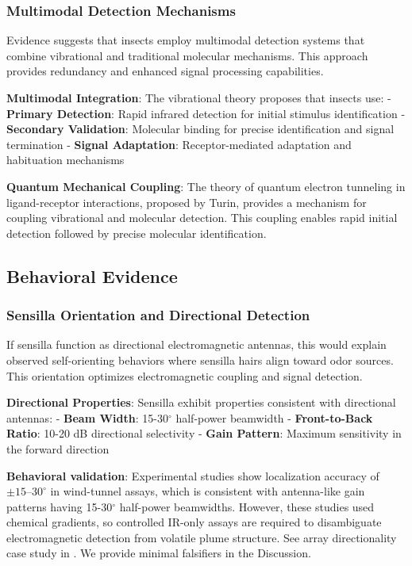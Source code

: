 \documentclass[
  13pt,
  a4paperpaper,
  12pt]{article}
\begin{document}
\subsubsection{Multimodal Detection
Mechanisms}\label{multimodal-detection-mechanisms}

Evidence suggests that insects employ multimodal detection systems that
combine vibrational and traditional molecular mechanisms. This approach
provides redundancy and enhanced signal processing capabilities.

\textbf{Multimodal Integration}: The vibrational theory proposes that
insects use: - \textbf{Primary Detection}: Rapid infrared detection for
initial stimulus identification - \textbf{Secondary Validation}:
Molecular binding for precise identification and signal termination -
\textbf{Signal Adaptation}: Receptor-mediated adaptation and habituation
mechanisms

\textbf{Quantum Mechanical Coupling}: The theory of quantum electron
tunneling in ligand-receptor interactions, proposed by Turin, provides a
mechanism for coupling vibrational and molecular detection. This
coupling enables rapid initial detection followed by precise molecular
identification.

\subsection{Behavioral Evidence}\label{behavioral-evidence}

\subsubsection{Sensilla Orientation and Directional
Detection}\label{sensilla-orientation-and-directional-detection}

If sensilla function as directional electromagnetic antennas, this would
explain observed self-orienting behaviors where sensilla hairs align
toward odor sources. This orientation optimizes electromagnetic coupling
and signal detection.

\textbf{Directional Properties}: Sensilla exhibit properties consistent
with directional antennas: - \textbf{Beam Width}: 15-30\(^{\circ}\)
half-power beamwidth - \textbf{Front-to-Back Ratio}: 10-20 dB
directional selectivity - \textbf{Gain Pattern}: Maximum sensitivity in
the forward direction

\textbf{Behavioral validation}: Experimental studies show localization
accuracy of \(\pm 15\text{--}30^{\circ}\) in wind-tunnel assays, which
is consistent with antenna-like gain patterns having 15-30\(^{\circ}\)
half-power beamwidths. However, these studies used chemical gradients,
so controlled IR-only assays are required to disambiguate
electromagnetic detection from volatile plume structure. See array
directionality case study in . We provide
minimal falsifiers in the Discussion.
\end{document}
